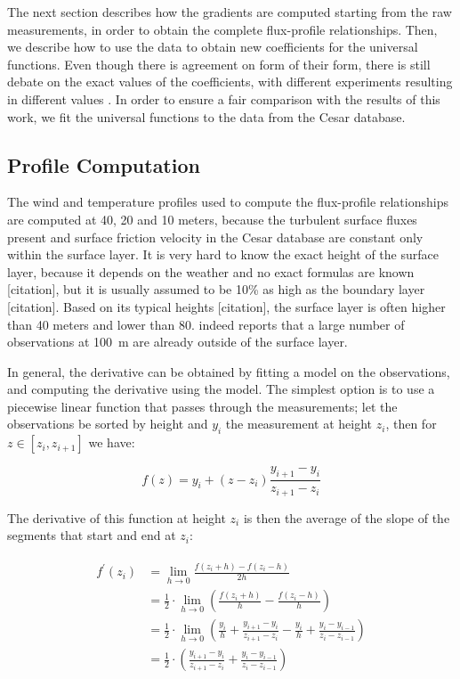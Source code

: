 \documentclass[12pt]{book}
\begin{document}
The next section describes how the gradients are computed starting from the raw measurements, in order to obtain the complete flux-profile relationships. Then, we describe how to use the data to obtain new coefficients for the universal functions. Even though there is agreement on form of their form, there is still debate on the exact values of the coefficients, with different experiments resulting in different values \cite{hogstrom88}. In order to ensure a fair comparison with the results of this work, we fit the universal functions to the data from the Cesar database.


\subsection{Profile Computation}
\label{sec:profiles}
The wind and temperature profiles used to compute the flux-profile relationships are computed at 40, 20 and 10 meters, because the turbulent surface fluxes present and surface friction velocity in the Cesar database are constant only within the surface layer. It is very hard to know the exact height of the surface layer, because it depends on the weather and no exact formulas are known [citation], but it is usually assumed to be 10\% as high as the boundary layer [citation]. Based on its typical heights [citation], the surface layer is often higher than 40 meters and lower than 80. \cite{cabauw_z0} indeed reports that a large number of observations at \SI{100}{\meter} are already outside of the surface layer.

In general, the derivative can be obtained by fitting a model on the observations, and computing the derivative using the model. The simplest option is to use a piecewise linear function that passes through the measurements; let the observations be sorted by height and $y_i$ the measurement at height $z_i$, then for $z\in[z_i,z_{i+1}]$ we have:

\begin{equation}
f(z)=y_i+(z-z_i)\frac{y_{i+1}-y_i}{z_{i+1}-z_i}
\end{equation}

The derivative of this function at height $z_i$ is then the average of the slope of the segments that start and end at $z_i$:

\begin{align}
\begin{split}
f^\prime(z_i)&=\lim_{h\rightarrow 0}\frac{f(z_i+h)-f(z_i-h)}{2h} \\
&=\frac{1}{2}\cdot\lim_{h\rightarrow 0}\left(\frac{f(z_i+h)}{h}-\frac{f(z_i-h)}{h}\right) \\
&=\frac{1}{2}\cdot\lim_{h\rightarrow 0}\left(
\frac{y_i}{h}+\frac{y_{i+1}-y_i}{z_{i+1}-z_i}-\frac{y_i}{h}+\frac{y_i-y_{i-1}}{z_i-z_{i-1}}
\right)\\
&=\frac{1}{2}\cdot\left(
\frac{y_{i+1}-y_i}{z_{i+1}-z_i}+\frac{y_i-y_{i-1}}{z_i-z_{i-1}}
\right)
\end{split}
\end{align}
\end{document}
